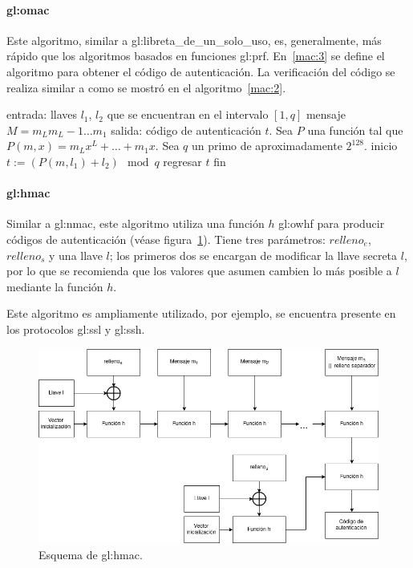 \paragraph{\texorpdfstring{\acrlong{gl:omac}}{One-time MAC}}
Este algoritmo, similar a \gls{gl:libreta_de_un_solo_uso}, es, generalmente,
más rápido que los algoritmos basados en funciones \gls{gl:prf}. En~\ref{mac:3}
se define el algoritmo para obtener el código de autenticación. La verificación
del código se realiza similar a como se mostró en el algoritmo~\ref{mac:2}.

\begin{pseudocodigo}[caption={MAC mediante \textit{One-time} MAC.},
  label={mac:3}]
    entrada:    llaves $l_1$, $l_2$ que se encuentran en el intervalo $[1,q]$
                mensaje $M = m_L m_L-1 \dots m_1$
    salida:     código de autenticación $t$.
    Sea $P$ una función tal que $P(m, x) = m_Lx^L + \dots + m_1x$.
    Sea $q$ un primo de aproximadamente $2^{128}$.
    inicio
      $t := (P(m, l_1) + l_2) \mod q$
      regresar $t$
    fin
\end{pseudocodigo}

\paragraph{\texorpdfstring{\acrlong{gl:hmac}}{Keyed-Hashed MAC}}
Similar a \gls{gl:nmac}, este algoritmo utiliza una función $h$ \gls{gl:owhf}
para producir códigos de autenticación (véase figura~\ref{mac:hmac}).
Tiene tres parámetros: $relleno_e$, $relleno_s$ y una llave $l$; los primeros
dos se encargan de modificar la llave secreta $l$, por lo que se recomienda que
los valores que asumen cambien lo más posible a $l$ mediante la función $h$.

Este algoritmo es ampliamente utilizado, por ejemplo, se encuentra presente en
los protocolos \gls{gl:ssl} y \gls{gl:ssh}.

\begin{figure}
  \begin{center}
    \includegraphics[width=0.9\linewidth]{diagramas/hmac.png}
    \caption{Esquema de \acrshort{gl:hmac}.}
    \label{mac:hmac}
  \end{center}
\end{figure}
